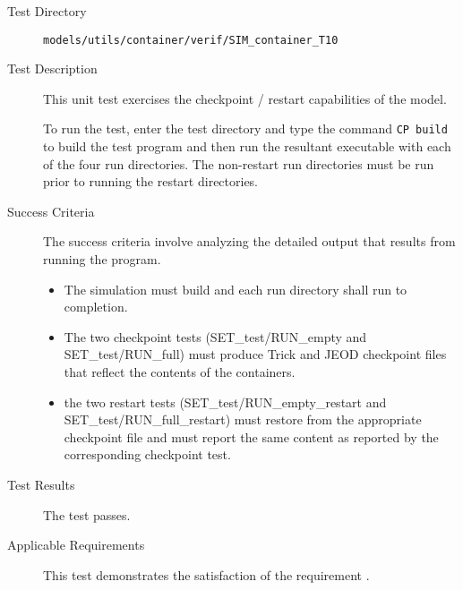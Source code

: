 \label{test:sim}
\begin{description}
\item[Test Directory]
{\tt models/utils/container/verif/SIM\_container\_T10}

\item[Test Description]
This unit test exercises the checkpoint / restart capabilities of the
model.

To run the test, enter the test directory and type the command
{\tt CP build} to build the test program and then run the resultant
executable with each of the four run directories. The non-restart
run directories must be run prior to running the restart directories.

\item[Success Criteria]
The success criteria involve analyzing the detailed output that results
from running the program.
\begin{itemize}
\item The simulation must build and each run directory shall
run to completion.
\item The two checkpoint tests (SET\_test/RUN\_empty and SET\_test/RUN\_full)
must produce Trick and JEOD checkpoint files that reflect the contents
of the containers.
\item the two restart tests (SET\_test/RUN\_empty\_restart and
SET\_test/RUN\_full\_restart) must restore from the appropriate checkpoint
file and must report the same content as reported by the corresponding
checkpoint test.
\end{itemize}

\item[Test Results]
The test passes.

\item[Applicable Requirements]
This test demonstrates the satisfaction of the 
requirement .

\end{description}
